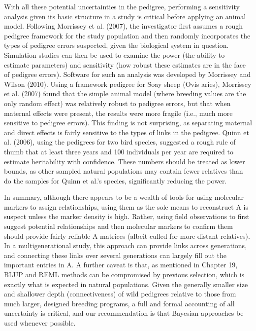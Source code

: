 \documentclass{article}
\begin{document}
With all these potential uncertainties in the pedigree, performing a sensitivity analysis given its basic structure in a study is critical before applying an animal model. Following Morrissey et al. (2007), the investigator first assumes a rough pedigree framework for the study population and then randomly incorporates the types of pedigree errors suspected, given the biological system in question. Simulation studies can then be used to examine the power (the ability to estimate parameters) and sensitivity (how robust these estimates are in the face of pedigree errors). Software for such an analysis was developed by Morrissey and Wilson (2010). Using a framework pedigree for Soay sheep (Ovis aries), Morrissey et al. (2007) found that the simple animal model (where breeding values are the only random effect) was relatively robust to pedigree errors, but that when maternal effects were present, the results were more fragile (i.e., much more sensitive to pedigree errors). This finding is not surprising, as separating maternal and direct effects is fairly sensitive to the types of links in the pedigree. Quinn et al. (2006), using the pedigrees for two bird species, suggested a rough rule of thumb that at least three years and 100 individuals per year are required to estimate heritability with confidence. These numbers should be treated as lower bounds, as other sampled natural populations may contain fewer relatives than do the samples for Quinn et al.'s species, significantly reducing the power.

In summary, although there appears to be a wealth of tools for using molecular markers to assign relationships, using them as the sole means to reconstruct A is suspect unless the marker density is high. Rather, using field observations to first suggest potential relationships and then molecular markers to confirm them should provide fairly reliable A matrices (albeit culled for more distant relatives). In a multigenerational study, this approach can provide links across generations, and connecting these links over several generations can largely fill out the important entries in A. A further caveat is that, as mentioned in Chapter 19, BLUP and REML methods can be compromised by previous selection, which is exactly what is expected in natural populations. Given the generally smaller size and shallower depth (connectiveness) of wild pedigrees relative to those from much larger, designed breeding programs, a full and formal accounting of all uncertainty is critical, and our recommendation is that Bayesian approaches be used whenever possible.
\end{document}
